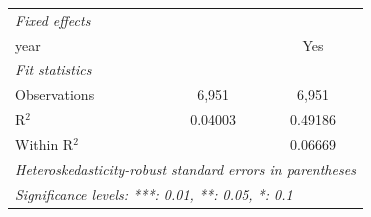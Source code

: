 \begin{tabular}{lcc}
   \midrule
   \emph{Fixed effects}\\
   year                &                 & Yes\\  
   \midrule
   \emph{Fit statistics}\\
   Observations        & 6,951           & 6,951\\  
   R$^2$               & 0.04003         & 0.49186\\  
   Within R$^2$        &                 & 0.06669\\  
   \midrule \midrule
   \multicolumn{3}{l}{\emph{Heteroskedasticity-robust standard errors in parentheses}}\\
   \multicolumn{3}{l}{\emph{Significance levels: ***: 0.01, **: 0.05, *: 0.1}}\\
\end{tabular}
\par\endgroup


